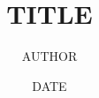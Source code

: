 \documentclass{beamer}
{{PREAMBLE}}
\title{{{TITLE}}}
\author{{{AUTHOR}}}
\date{{{DATE}}}

\frame{\titlepage}
\begin{frame}[allowframebreaks]{}
{{BODY}}
\end{frame}
{{BIB}}


